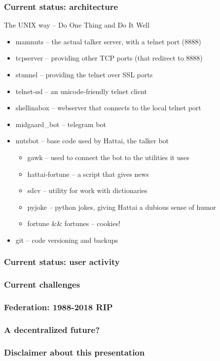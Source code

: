 \documentclass[aspectratio=169]{beamer}
\begin{document}
\begin{frame}
\frametitle{Current status: architecture}
The UNIX way -- Do One Thing and Do It Well
\begin{itemize}
  \item{} mamnuts -- the actual talker server, with a telnet port (8888)
  \item{} tcpserver -- providing other TCP ports (that redirect to 8888)
  \item{} stunnel -- providing the telnet over SSL ports
  \item{} telnet-ssl -- an unicode-friendly telnet client
  \item{} shellinabox -- webserver that connects to the local telnet port
  \item{} midgaard\_bot -- telegram bot
  \item{} nutsbot -- base code used by Hattai, the talker bot
    \begin{itemize}
      \item{} gawk -- used to connect the bot to the utilities it uses
      \item{} hattai-fortune -- a script that gives news
      \item{} sdcv -- utility for work with dictionaries
      \item{} pyjoke -- python jokes, giving Hattai a dubious sense of humor
      \item{} fortune \&\& fortunes -- cookies!
    \end{itemize}
  \item{} git -- code versioning and backups
\end{itemize}
\end{frame}

\begin{frame}
\frametitle{Current status: user activity}
\end{frame}

\begin{frame}
\frametitle{Current challenges}
\end{frame}


\begin{frame}
\frametitle{Federation: 1988-2018 RIP}
\end{frame}

\begin{frame}
\frametitle{A decentralized future?}
\end{frame}

\begin{frame}
\frametitle{Disclaimer about this presentation}
\end{frame}

\subtitle{Thank you}
\frame[plain]{\titlepage}
\end{document}
